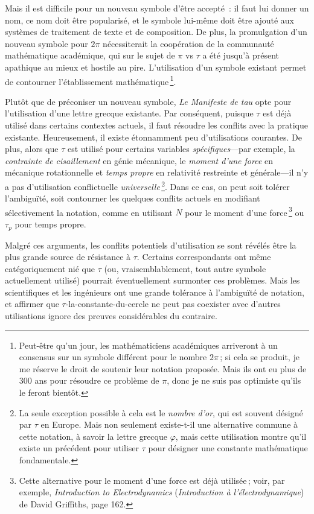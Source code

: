 Mais il est difficile pour un nouveau symbole d'être accepté~: il faut lui donner un nom, ce nom doit être popularisé, et le symbole lui-même doit être ajouté aux systèmes de traitement de texte et de composition. De plus, la promulgation d'un nouveau symbole pour $2\pi$ nécessiterait la coopération de la communauté mathématique académique, qui sur le sujet de $\pi$ vs $\tau$ a été jusqu'à présent apathique au mieux et hostile au pire. L'utilisation d'un symbole existant permet de contourner l'établissement mathématique\,\footnote{Peut-être qu'un jour, les mathématiciens académiques arriveront à un consensus sur un symbole différent pour le nombre $2\pi$\,; si cela se produit, je me réserve le droit de soutenir leur notation proposée. Mais ils ont eu plus de 300 ans pour résoudre ce problème de $\pi$, donc je ne suis pas optimiste qu'ils le feront bientôt.}.

Plutôt que de préconiser un nouveau symbole, \emph{Le Manifeste de tau} opte pour l'utilisation d'une lettre grecque existante. Par conséquent, puisque $\tau$ est déjà utilisé dans certains contextes actuels, il faut résoudre les conflits avec la pratique existante. Heureusement, il existe étonnamment peu d'utilisations courantes. De plus, alors que $\tau$ est utilisé pour certains variables \emph{spécifiques}---par exemple, la \emph{contrainte de cisaillement} en génie mécanique, le \emph{moment d'une force} en mécanique rotationnelle et \emph{temps propre} en relativité restreinte et générale---il n'y a pas d'utilisation conflictuelle \emph{universelle}\,\footnote{La seule exception possible à cela est le \emph{nombre d'or}, qui est souvent désigné par $\tau$ en Europe. Mais non seulement existe-t-il une alternative commune à cette notation, à savoir la lettre grecque $\varphi$, mais cette utilisation montre qu'il existe un précédent pour utiliser $\tau$ pour désigner une constante mathématique fondamentale.}. Dans ce cas, on peut soit tolérer l'ambiguïté, soit contourner les quelques conflits actuels en modifiant sélectivement la notation, comme en utilisant $N$ pour le moment d'une force\,\footnote{Cette alternative pour le moment d'une force est déjà utilisée\,; voir, par exemple, \emph{Introduction to Electrodynamics} (\emph{Introduction à l'électrodynamique}) de David Griffiths, page 162.} ou $\tau_p$ pour temps propre.

Malgré ces arguments, les conflits potentiels d'utilisation se sont révélés être la plus grande source de résistance à $\tau$. Certains correspondants ont même catégoriquement nié que $\tau$ (ou, vraisemblablement, tout autre symbole actuellement utilisé) pourrait éventuellement surmonter ces problèmes. Mais les scientifiques et les ingénieurs ont une grande tolérance à l'ambiguïté de notation, et affirmer que $\tau$-la-constante-du-cercle ne peut pas coexister avec d'autres utilisations ignore des preuves considérables du contraire.

